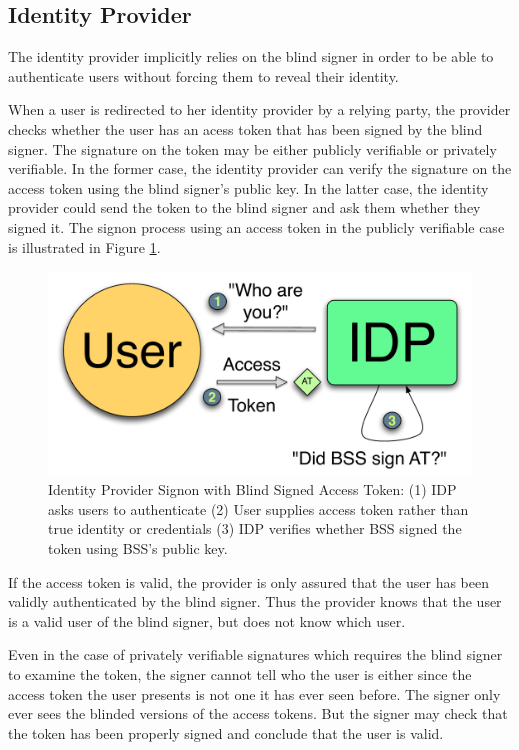 \documentclass{llncs}
\begin{document}
\subsection{Identity Provider}

The identity provider implicitly relies on the blind signer in order to be able
to authenticate users without forcing them to reveal their identity.

When a user is redirected to her identity provider by a relying party, the
provider checks whether the user has an acess token that has been signed by the
blind signer. The signature on the token may be either publicly verifiable or
privately verifiable. In the former case, the identity provider can verify the
signature on the access token using the blind signer's public key. In the latter
case, the identity provider could send the token to the blind signer and ask
them whether they signed it. The signon process using an access token in the
publicly verifiable case is illustrated in Figure \ref{fig:bss-signon}.

\begin{figure}
  \centering
  \includegraphics[scale=0.6]{figs/fig-bss-signon-color.pdf}
  \caption{Identity Provider Signon with Blind Signed Access Token: (1) IDP asks
  users to authenticate (2) User supplies access token rather than true identity
  or credentials (3) IDP verifies whether BSS signed the token using BSS's
  public key.}
  \label{fig:bss-signon}
\end{figure}

If the access token is valid, the provider is only assured that the user has
been validly authenticated by the blind signer. Thus the provider knows that the
user is a valid user of the blind signer, but does not know which user.

Even in the case of privately verifiable signatures which requires the blind
signer to examine the token, the signer cannot tell who the user is either since
the access token the user presents is not one it has ever seen before. The
signer only ever sees the blinded versions of the access tokens. But the signer
may check that the token has been properly signed and conclude that the user is
valid.
\end{document}
